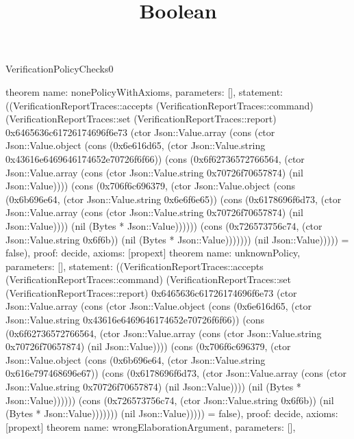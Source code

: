 \begin{lexlean}{VerificationPolicyChecks0}
\title{Boolean}
\begin{semanticmodule}
theorem{
  name: nonePolicyWithAxioms,
  parameters: [],
  statement: ((VerificationReportTraces::accepts (VerificationReportTraces::command) (VerificationReportTraces::set (VerificationReportTraces::report) 0x6465636c61726174696f6e73 (ctor Json::Value.array (cons (ctor Json::Value.object (cons (0x6e616d65, (ctor Json::Value.string 0x43616e6469646174652e70726f6f66)) (cons (0x6f62736572766564, (ctor Json::Value.array (cons (ctor Json::Value.string 0x70726f70657874) (nil Json::Value)))) (cons (0x706f6c696379, (ctor Json::Value.object (cons (0x6b696e64, (ctor Json::Value.string 0x6e6f6e65)) (cons (0x6178696f6d73, (ctor Json::Value.array (cons (ctor Json::Value.string 0x70726f70657874) (nil Json::Value)))) (nil (Bytes * Json::Value)))))) (cons (0x726573756c74, (ctor Json::Value.string 0x6f6b)) (nil (Bytes * Json::Value))))))) (nil Json::Value))))) = false),
  proof: decide{},
  axioms: [propext]
}
theorem{
  name: unknownPolicy,
  parameters: [],
  statement: ((VerificationReportTraces::accepts (VerificationReportTraces::command) (VerificationReportTraces::set (VerificationReportTraces::report) 0x6465636c61726174696f6e73 (ctor Json::Value.array (cons (ctor Json::Value.object (cons (0x6e616d65, (ctor Json::Value.string 0x43616e6469646174652e70726f6f66)) (cons (0x6f62736572766564, (ctor Json::Value.array (cons (ctor Json::Value.string 0x70726f70657874) (nil Json::Value)))) (cons (0x706f6c696379, (ctor Json::Value.object (cons (0x6b696e64, (ctor Json::Value.string 0x616e797468696e67)) (cons (0x6178696f6d73, (ctor Json::Value.array (cons (ctor Json::Value.string 0x70726f70657874) (nil Json::Value)))) (nil (Bytes * Json::Value)))))) (cons (0x726573756c74, (ctor Json::Value.string 0x6f6b)) (nil (Bytes * Json::Value))))))) (nil Json::Value))))) = false),
  proof: decide{},
  axioms: [propext]
}
theorem{
  name: wrongElaborationArgument,
  parameters: [],
}
\end{semanticmodule}
\end{lexlean}
